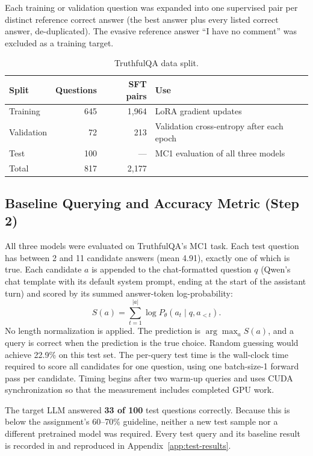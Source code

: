 \documentclass[11pt]{article}
\begin{document}
Each training or validation question was expanded into one supervised pair per distinct reference correct answer (the best answer plus every listed correct answer, de-duplicated). The evasive reference answer ``I have no comment'' was excluded as a training target.

\begin{table}[H]
  \centering
  \caption{TruthfulQA data split.}
  \label{tab:data-split}
  \begin{tabular}{lrrl}
    \toprule
    \textbf{Split} & \textbf{Questions} & \textbf{SFT pairs} & \textbf{Use} \\
    \midrule
    Training & 645 & 1,964 & LoRA gradient updates \\
    Validation & 72 & 213 & Validation cross-entropy after each epoch \\
    Test & 100 & --- & MC1 evaluation of all three models \\
    \midrule
    Total & 817 & 2,177 & \\
    \bottomrule
  \end{tabular}
\end{table}

\subsection{Baseline Querying and Accuracy Metric (Step 2)}

All three models were evaluated on TruthfulQA's MC1 task. Each test question has between 2 and 11 candidate answers (mean 4.91), exactly one of which is true. Each candidate $a$ is appended to the chat-formatted question $q$ (Qwen's chat template with its default system prompt, ending at the start of the assistant turn) and scored by its summed answer-token log-probability:
\[
  S(a) = \sum_{t=1}^{|a|} \log P_\theta\!\left(a_t \mid q, a_{<t}\right).
\]
No length normalization is applied. The prediction is $\arg\max_a S(a)$, and a query is correct when the prediction is the true choice. Random guessing would achieve 22.9\% on this test set. The per-query test time is the wall-clock time required to score all candidates for one question, using one batch-size-1 forward pass per candidate. Timing begins after two warm-up queries and uses CUDA synchronization so that the measurement includes completed GPU work.

The target LLM answered \textbf{33 of 100} test questions correctly. Because this is below the assignment's 60--70\% guideline, neither a new test sample nor a different pretrained model was required. Every test query and its baseline result is recorded in  and reproduced in Appendix~\ref{app:test-results}.
\end{document}
